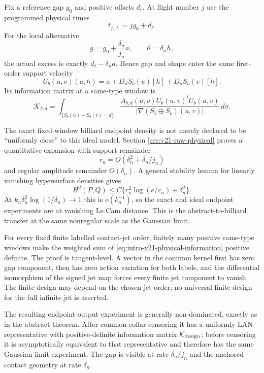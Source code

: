 Fix a reference gap $g_0$ and positive offsets $d_\ell$.  At flight number
$j$ use the programmed physical times
\[
                         t_{j,\ell}=jg_0+d_\ell.
\]
For the local alternative
\begin{equation}\label{eq:intro-v21-multirate}
 g=g_0+\frac{\delta_n}{j_n}a,
 \qquad
 \vartheta=\delta_nh,
\end{equation}
the actual excess is exactly
$d_\ell-\delta_na$.  Hence gap and shape enter the same first-order support
velocity
\[
 U_b(u,v)(a,h)
 =a+D_\vartheta S_b(u)[h]+D_\vartheta S_b(v)[h].
\]
Its information matrix at a same-type window is
\begin{equation}\label{eq:intro-v21-physical-information}
 \mathcal K_{b,d}
 =\int_{\{S_b(u)+S_b(v)=d\}}
 \frac{A_{b,d}(u,v)U_b(u,v)^tU_b(u,v)}
 {|\nabla(S_b\oplus S_b)(u,v)|}\,d\sigma.
\end{equation}

The exact fixed-window billiard endpoint density is not merely declared to be
``uniformly close'' to this ideal model.  Section
\ref{sec:v21-raw-physical} proves a quantitative expansion with support
remainder
\[
 r_n=O(\delta_n^2+\delta_n/j_n)
\]
and regular amplitude remainder $O(\delta_n)$.  A general stability lemma for
linearly vanishing hypersurface densities gives
\[
 H^2(P,Q)\le C\{r_n^2\log(e/r_n)+\delta_n^2\}.
\]
At $k_n\delta_n^2\log(1/\delta_n)\to1$ this is $o(k_n^{-1})$, so the exact
and ideal endpoint experiments are at vanishing Le Cam distance.  This is the
abstract-to-billiard transfer at the same nonregular scale as the Gaussian
limit.

For every fixed finite labelled contact-jet order, finitely many positive
same-type windows make the weighted sum of
\eqref{eq:intro-v21-physical-information} positive definite.  The proof is
tangent-level.  A vector in the common kernel first has zero gap component,
then has zero action variation for both labels, and the differential
isomorphism of the signed jet map forces every finite jet component to
vanish.  The finite design may depend on the chosen jet order; no universal
finite design for the full infinite jet is asserted.

The resulting endpoint-output experiment is generally non-dominated, exactly
as in the abstract theorem.  After common-collar censoring it has a uniformly
LAN representative with positive-definite information matrix
$\mathcal K_{\rm design}$; before censoring it is asymptotically equivalent
to that representative and therefore has the same Gaussian limit experiment.
The gap is visible at rate $\delta_n/j_n$ and the anchored contact geometry at
rate $\delta_n$.

